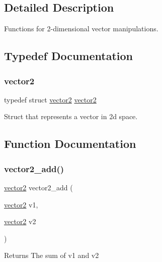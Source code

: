 \subsection{Detailed Description}
Functions for 2-\/dimensional vector manipulations. 



\subsection{Typedef Documentation}
\mbox{\label{group__vector2_ga79bfbffebc693e35657aa7eec9499688}} 
\subsubsection{\texorpdfstring{vector2}{vector2}}
{\footnotesize\ttfamily typedef struct \hyperlink{structvector2}{vector2}  \hyperlink{structvector2}{vector2}}



Struct that represents a vector in 2d space. 



\subsection{Function Documentation}
\mbox{\label{group__vector2_ga8a53b9698cf1172ab388531dcd3d8399}} 
\subsubsection{\texorpdfstring{vector2\+\_\+add()}{vector2\_add()}}
{\footnotesize\ttfamily \hyperlink{structvector2}{vector2} vector2\+\_\+add (\begin{DoxyParamCaption}\item[{\hyperlink{structvector2}{vector2}}]{v1,  }\item[{\hyperlink{structvector2}{vector2}}]{v2 }\end{DoxyParamCaption})}

\begin{DoxyReturn}{Returns}
The sum of v1 and v2 
\end{DoxyReturn}
\mbox{\label{group__vector2_ga03173bb05b63e8723fc6e54cf55dff71}} 
